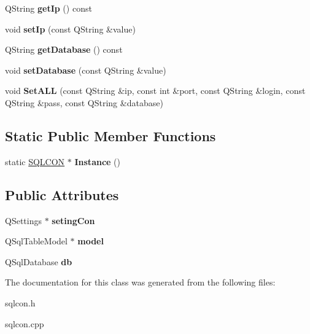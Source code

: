 \begin{DoxyCompactItemize}
Q\+String {\bfseries get\+Ip} () const
\item 
\hypertarget{class_s_q_l_c_o_n_a550d016acbe567d39b305e2a7fb8f28b}{}\label{class_s_q_l_c_o_n_a550d016acbe567d39b305e2a7fb8f28b} 
void {\bfseries set\+Ip} (const Q\+String \&value)
\item 
\hypertarget{class_s_q_l_c_o_n_ac6f8507d63e35bc94b2fa216fd06ea9a}{}\label{class_s_q_l_c_o_n_ac6f8507d63e35bc94b2fa216fd06ea9a} 
Q\+String {\bfseries get\+Database} () const
\item 
\hypertarget{class_s_q_l_c_o_n_ae184f19921d7a660c5fe3aeacc780799}{}\label{class_s_q_l_c_o_n_ae184f19921d7a660c5fe3aeacc780799} 
void {\bfseries set\+Database} (const Q\+String \&value)
\item 
\hypertarget{class_s_q_l_c_o_n_a1e4553479c568ff8e8cecb4c715b9789}{}\label{class_s_q_l_c_o_n_a1e4553479c568ff8e8cecb4c715b9789} 
void {\bfseries Set\+A\+LL} (const Q\+String \&ip, const int \&port, const Q\+String \&login, const Q\+String \&pass, const Q\+String \&database)
\end{DoxyCompactItemize}
\subsection*{Static Public Member Functions}
\begin{DoxyCompactItemize}
\item 
\hypertarget{class_s_q_l_c_o_n_a4fd172050070114e2a4f437813bc562d}{}\label{class_s_q_l_c_o_n_a4fd172050070114e2a4f437813bc562d} 
static \hyperlink{class_s_q_l_c_o_n}{S\+Q\+L\+C\+ON} $\ast$ {\bfseries Instance} ()
\end{DoxyCompactItemize}
\subsection*{Public Attributes}
\begin{DoxyCompactItemize}
\item 
\hypertarget{class_s_q_l_c_o_n_aa374c0b48052761661e1b6f6698720a1}{}\label{class_s_q_l_c_o_n_aa374c0b48052761661e1b6f6698720a1} 
Q\+Settings $\ast$ {\bfseries seting\+Con}
\item 
\hypertarget{class_s_q_l_c_o_n_a1c89a7db1675e4d0059007d7a55fa267}{}\label{class_s_q_l_c_o_n_a1c89a7db1675e4d0059007d7a55fa267} 
Q\+Sql\+Table\+Model $\ast$ {\bfseries model}
\item 
\hypertarget{class_s_q_l_c_o_n_a6f3284962c11a9f770838cac2700faf5}{}\label{class_s_q_l_c_o_n_a6f3284962c11a9f770838cac2700faf5} 
Q\+Sql\+Database {\bfseries db}
\end{DoxyCompactItemize}


The documentation for this class was generated from the following files\+:\begin{DoxyCompactItemize}
\item 
sqlcon.\+h\item 
sqlcon.\+cpp\end{DoxyCompactItemize}
